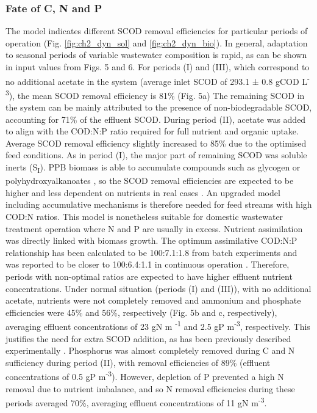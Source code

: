 \subsubsection{Fate of C, N and P}
The model indicates different SCOD removal efficiencies for particular periods of operation (Fig. \ref{fig:ch2_dyn_sol} and \ref{fig:ch2_dyn_bio}). In general, adaptation to seasonal periods of variable wastewater composition is rapid, as can be shown in input values from Figs. 5 and 6. For periods (I) and (III), which correspond to no additional acetate in the system (average inlet SCOD of 293.1 ± 0.8 gCOD L\textsuperscript{-3}), the mean SCOD removal efficiency is 81\% (Fig. 5a) The remaining SCOD in the system can be mainly attributed to the presence of non-biodegradable SCOD, accounting for 71\% of the effluent SCOD. During period (II), acetate was added to align with the COD:N:P ratio required for full nutrient and organic uptake. Average SCOD removal efficiency slightly increased to 85\% due to the optimised feed conditions. As in period (I), the major part of remaining SCOD was soluble inerts (S\textsubscript{I}). PPB biomass is able to accumulate compounds such as glycogen or polyhydroxyalkanoates \cite{melnicki2009}, so the SCOD removal efficiencies are expected to be higher and less dependent on nutrients in real cases \cite{hulsen2016,hulsen2016a}. An upgraded model including accumulative mechanisms is therefore needed for feed streams with high COD:N ratios. This model is nonetheless suitable for domestic wastewater treatment operation where N and P are usually in excess. 
\skippingparagraph
Nutrient assimilation was directly linked with biomass growth. The optimum assimilative COD:N:P relationship has been calculated to be 100:7.1:1.8 from batch experiments \cite{hulsen2014} and was reported to be closer to 100:6.4:1.1 in continuous operation \cite{hulsen2016a}. Therefore, periods with non-optimal ratios are expected to have higher effluent nutrient concentrations. Under normal situation (periods (I) and (III)), with no additional acetate, nutrients were not completely removed and ammonium and phosphate efficiencies were 45\% and 56\%, respectively (Fig. 5b and c, respectively), averaging effluent concentrations of 23 gN m \textsuperscript{-1} and 2.5 gP m\textsuperscript{-3}, respectively. This justifies the need for extra SCOD addition, as has been previously described experimentally \cite{hulsen2016}. Phosphorus was almost completely removed during C and N sufficiency during period (II), with removal efficiencies of 89\% (effluent concentrations of 0.5 gP m\textsuperscript{-3}). However, depletion of P prevented a high N removal due to nutrient imbalance, and so N removal efficiencies during these periods averaged 70\%, averaging effluent concentrations of 11 gN m\textsuperscript{-3}. 
